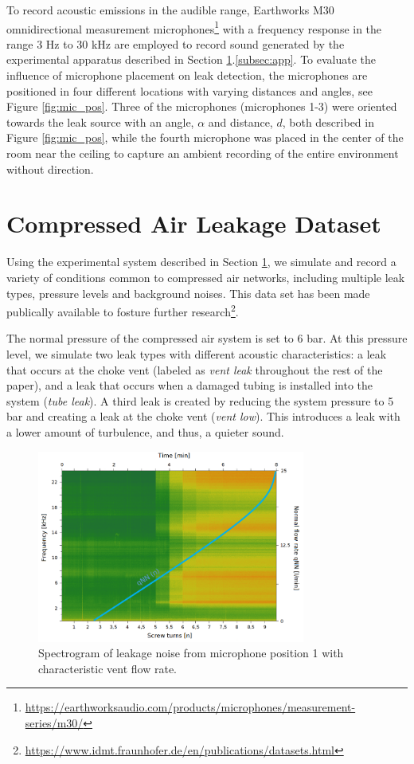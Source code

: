 To record acoustic emissions in the audible range, Earthworks M30 omnidirectional measurement microphones\footnote{\url{https://earthworksaudio.com/products/microphones/measurement-series/m30/}} with a frequency response in the range 3 Hz to 30 kHz are employed to record sound generated by the experimental apparatus described in Section \ref{sec:dataset}.\ref{subsec:app}.  %
To evaluate the influence of microphone placement on leak detection, the microphones are positioned in four different locations with varying distances and angles, see Figure \ref{fig:mic_pos}. Three of the microphones (microphones 1-3) were oriented towards the leak source with an angle, $\alpha$ and distance, $d$, both described in Figure \ref{fig:mic_pos}, while the fourth microphone was placed in the center of the room near the ceiling to capture an ambient recording of the entire environment without direction.

\section{Compressed Air Leakage Dataset}\label{sec:dataset}

Using the experimental system described in Section \ref{sec:dataset}, we simulate and record a variety of conditions common to compressed air networks, including multiple leak types, pressure levels and background noises. This data set has been made publically available to fosture further research\footnote{\url{https://www.idmt.fraunhofer.de/en/publications/datasets.html}}. 

The normal pressure of the compressed air system is set to 6 bar. At this pressure level, we simulate two leak types with different acoustic characteristics: a leak that occurs at the choke vent (labeled as \textit{vent leak} throughout the rest of the paper), and a leak that occurs when a damaged tubing is installed into the system (\textit{tube leak}). A third leak is created by reducing the system pressure to 5 bar and creating a leak at the choke vent (\textit{vent low}). This introduces a leak with a lower amount of turbulence, and thus, a quieter sound.

\begin{figure}[h]
	\centering
	\includegraphics[width=88mm]{images/V_1_normi_qnn.png}
	\caption{Spectrogram of leakage noise from microphone position 1 with characteristic vent flow rate.}
	\label{fig:spec+qnn}
\end{figure}

